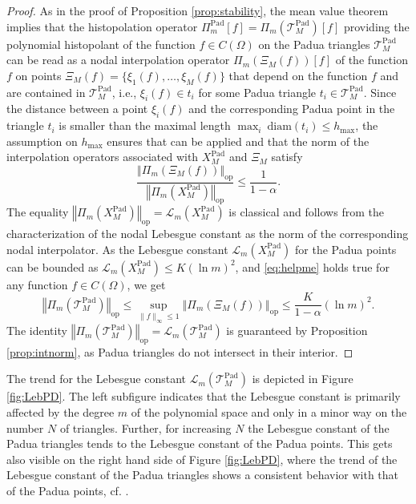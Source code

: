 \documentclass{svjour3}
\begin{document}
\begin{proof}
    As in the proof of Proposition \ref{prop:stability}, the mean value theorem implies that the histopolation operator $\Pi_{m}^{\mathrm{Pad}} [f] = \Pi_m(\mathcal{T}_M^{\mathrm{Pad}}) [f]$ providing the polynomial histopolant of the function $f \in C(\Omega)$ on the Padua triangles $\mathcal{T}_M^{\mathrm{Pad}}$ can be read as a nodal interpolation operator $\Pi_m(\Xi_M(f))$$ [f]$ of the function $f$ on points $ \Xi_M(f) = \{ \xi_1(f), \ldots, \xi_M(f) \} $ that depend on the function $f$ and are contained in $\mathcal{T}_M^{\mathrm{Pad}}$, i.e., $ \xi_i(f) \in t_i $ for some Padua triangle $t_i \in \mathcal{T}_M^{\mathrm{Pad}}$. Since the distance between a point $\xi_i(f)$ and the corresponding Padua point in the triangle $t_i$ is smaller than the maximal length $ \max_i \ \mathrm{diam} \left(t_i\right) \leq h_{\max} $, the assumption on $h_{\max}$ ensures that \cite[Corollary 1]{PiazzonVianello} can be applied and that the norm of the interpolation operators associated with $ X_M^{\mathrm{Pad}} $ and $\Xi_M$ satisfy
	\begin{equation} \label{eq:helpme}
	\frac{\left\Vert \Pi_m(\Xi_M(f)) \right\Vert_{\mathrm{op}}}{\left\Vert \Pi_m(X_M^{\mathrm{Pad}}) \right\Vert_{\mathrm{op}}} \leq \frac{1}{1-\alpha}.  
	\end{equation} 
	The equality $ \left\Vert \Pi_m(X_M^{\mathrm{Pad}}) \right\Vert_{\mathrm{op}} = \mathscr{L}_m \left(X_M^{\mathrm{Pad}}\right) $ is classical and follows from the characterization of the nodal Lebesgue constant as the norm of the corresponding nodal interpolator. As the Lebesgue constant $ \mathscr{L}_m \left(X_M^{\mathrm{Pad}}\right) $ for the Padua points can be bounded as $\mathscr{L}_m \left(X_M^{\mathrm{Pad}}\right) \leq K \left(\ln m\right)^2 $, and \eqref{eq:helpme} holds true for any function $f \in C(\Omega)$, we get
    \[ \left\Vert \Pi_m(\mathcal{T}_M^{\mathrm{Pad}}) \right\Vert_{\mathrm{op}} \leq \sup_{ \| f \|_{\infty} \leq 1} \left\Vert \Pi_m(\Xi_M(f)) \right\Vert_{\mathrm{op}} \leq \frac{K}{1-\alpha} \left(\ln m\right)^2. \]
    The identity $ \left\Vert \Pi_m(\mathcal{T}_M^{\mathrm{Pad}}) \right\Vert_{\mathrm{op}} = \mathscr{L}_m \left(\mathcal{T}_M^{\mathrm{Pad}}\right) $ is guaranteed by Proposition \ref{prop:intnorm}, as Padua triangles do not intersect in their interior.
\end{proof}

The trend for the Lebesgue constant $\mathscr{L}_m \left( \mathcal{T}_M^{\mathrm{Pad}} \right) $ is depicted in Figure \ref{fig:LebPD}.
The left subfigure indicates that the Lebesgue constant is primarily affected by the degree $m$ of the polynomial space and only in a minor way on the number $N$ of triangles. Further, for increasing $N$ the Lebesgue constant of the Padua triangles tends to the Lebesgue constant of the Padua points. This gets also visible on the right hand side of Figure \ref{fig:LebPD}, where the trend of the Lebesgue constant of the Padua triangles shows a consistent behavior with that of the Padua points, cf. \cite{Bos;2006:BLI}.
\end{document}
